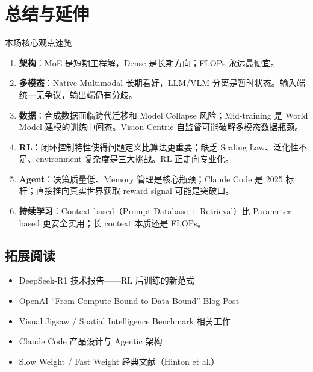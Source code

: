 \section{总结与延伸}

\begin{importantbox}{本场核心观点速览}
\begin{enumerate}
  \item \textbf{架构}：MoE 是短期工程解，Dense 是长期方向；FLOPs 永远最便宜。
  \item \textbf{多模态}：Native Multimodal 长期看好，LLM/VLM 分离是暂时状态。输入端统一无争议，输出端仍有分歧。
  \item \textbf{数据}：合成数据面临跨代迁移和 Model Collapse 风险；Mid-training 是 World Model 建模的训练中间态。Vision-Centric 自监督可能破解多模态数据瓶颈。
  \item \textbf{RL}：闭环控制特性使得问题定义比算法更重要；缺乏 Scaling Law、泛化性不足、environment 复杂度是三大挑战。RL 正走向专业化。
  \item \textbf{Agent}：决策质量低、Memory 管理是核心瓶颈；Claude Code 是 2025 标杆；直接推向真实世界获取 reward signal 可能是突破口。
  \item \textbf{持续学习}：Context-based（Prompt Database + Retrieval）比 Parameter-based 更安全实用；长 context 本质还是 FLOPs。
\end{enumerate}
\end{importantbox}

\subsection{拓展阅读}
\begin{itemize}
  \item DeepSeek-R1 技术报告——RL 后训练的新范式
  \item OpenAI ``From Compute-Bound to Data-Bound'' Blog Post
  \item Visual Jigsaw / Spatial Intelligence Benchmark 相关工作
  \item Claude Code 产品设计与 Agentic 架构
  \item Slow Weight / Fast Weight 经典文献（Hinton et al.）
\end{itemize}


